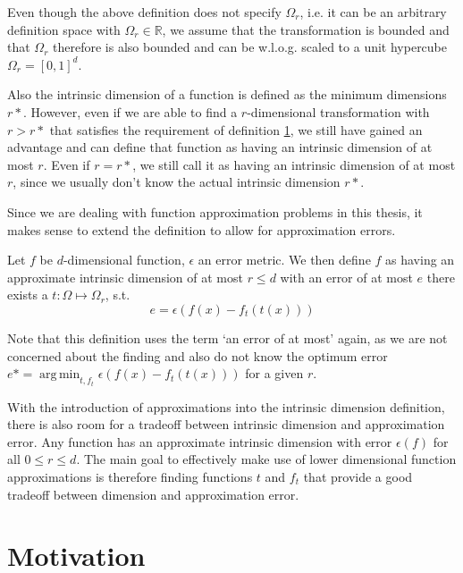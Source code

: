 \documentclass[
  a4paper,  %
  twoside,  %
  bibliography=totoc,
  headsepline,
  cleardoublepage=empty,
  parskip=half,
  draft=false
]{scrbook}
\DeclareMathOperator*{\argmin}{arg\,min}
\begin{document}
Even though the above definition does not specify $\Omega_r$, i.e. it can be an arbitrary definition space with $\Omega_r \in \mathds{R}$, we assume that the transformation is bounded and that $\Omega_r$ therefore is also bounded and can be w.l.o.g. scaled to a unit hypercube $\Omega_r=[0,1]^d$.

Also the intrinsic dimension of a function is defined as the minimum dimensions $r*$.
However, even if we are able to find a $r$-dimensional transformation with $r > r*$ that satisfies the requirement of definition \ref{}, we still have gained an advantage and can define that function as having an intrinsic dimension of at most $r$.
Even if $r=r*$, we still call it as having an intrinsic dimension of at most $r$, since we usually don't know the actual intrinsic dimension $r*$.

Since we are dealing with function approximation problems in this thesis, it makes sense to extend the definition to allow for approximation errors.
\begin{definition}
Let $f$ be $d$-dimensional function, $\epsilon$ an error metric.
We then define $f$ as having an approximate intrinsic dimension of at most $r \leq d$ with an error of at most $e$ there exists a $t \colon \Omega \mapsto \Omega_r$, s.t.
\begin{equation}
e=\epsilon(f(x) - f_t(t(x)))
\end{equation}
\end{definition}
Note that this definition uses the term `an error of at most' again, as we are not concerned about the finding and also do not know the optimum error $e*= \argmin_{t, f_t} \epsilon(f(x) - f_t(t(x)))$ for a given $r$.

With the introduction of approximations into the intrinsic dimension definition, there is also room for a tradeoff between  intrinsic dimension and approximation error.
Any function has an approximate intrinsic dimension with error $\epsilon(f)$ for all $0 \leq r \leq d$.
The main goal to effectively make use of lower dimensional function approximations is therefore finding functions $t$ and $f_t$ that provide a good tradeoff between dimension and approximation error.

\section{Motivation}
\end{document}
